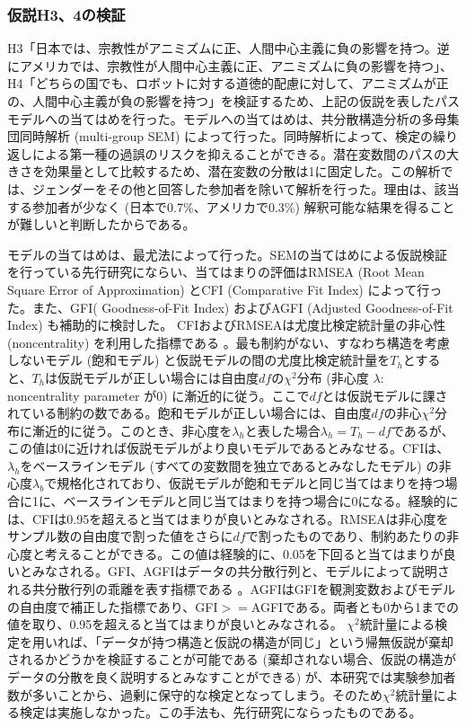 \documentclass[a4j,12pt]{jreport}
\begin{document}
\subsubsection{仮説H3、4の検証}
H3「日本では、宗教性がアニミズムに正、人間中心主義に負の影響を持つ。逆にアメリカでは、宗教性が人間中心主義に正、アニミズムに負の影響を持つ」、H4「どちらの国でも、ロボットに対する道徳的配慮に対して、アニミズムが正の、人間中心主義が負の影響を持つ」を検証するため、上記の仮説を表したパスモデルへの当てはめを行った。モデルへの当てはめは、共分散構造分析の多母集団同時解析 (multi-group SEM) によって行った。同時解析によって、検定の繰り返しによる第一種の過誤のリスクを抑えることができる。潜在変数間のパスの大きさを効果量として比較するため、潜在変数の分散は1に固定した。この解析では、ジェンダーをその他と回答した参加者を除いて解析を行った。理由は、該当する参加者が少なく (日本で0.7\%、アメリカで0.3\%) 解釈可能な結果を得ることが難しいと判断したからである。


モデルの当てはめは、最尤法によって行った。SEMの当てはめによる仮説検証を行っている先行研究\cite{noren}にならい、当てはまりの評価はRMSEA (Root Mean Square Error of Approximation) とCFI (Comparative Fit Index) によって行った。また、GFI( Goodness-of-Fit Index) およびAGFI (Adjusted Goodness-of-Fit Index) も補助的に検討した。
CFIおよびRMSEAは尤度比検定統計量の非心性 (noncentrality) を利用した指標である\cite{hishin} 。最も制約がない、すなわち構造を考慮しないモデル (飽和モデル) と仮説モデルの間の尤度比検定統計量を$T_h$とすると、$T_h$は仮説モデルが正しい場合には自由度$df$の$\chi^2$分布 (非心度 $\lambda$: noncentrality parameter が0) に漸近的に従う。ここで$df$とは仮説モデルに課されている制約の数である。飽和モデルが正しい場合には、自由度$df$の非心$\chi^2$分布に漸近的に従う。このとき、非心度を$\lambda_h$と表した場合$\lambda_h=T_h - df$であるが、この値は0に近ければ仮説モデルがより良いモデルであるとみなせる。CFIは、$\lambda_h$をベースラインモデル (すべての変数間を独立であるとみなしたモデル) の非心度$\lambda_b$で規格化されており、仮説モデルが飽和モデルと同じ当てはまりを持つ場合に1に、ベースラインモデルと同じ当てはまりを持つ場合に0になる。経験的には、CFIは0.95を超えると当てはまりが良いとみなされる。RMSEAは非心度をサンプル数の自由度で割った値をさらに$df$で割ったものであり、制約あたりの非心度と考えることができる。この値は経験的に、0.05を下回ると当てはまりが良いとみなされる。GFI、AGFIはデータの共分散行列と、モデルによって説明される共分散行列の乖離を表す指標である\cite{hishin} 。AGFIはGFIを観測変数およびモデルの自由度で補正した指標であり、GFI$>=$AGFIである。両者とも0から1までの値を取り、0.95を超えると当てはまりが良いとみなされる。
$\chi ^2$統計量による検定を用いれば、「データが持つ構造と仮説の構造が同じ」という帰無仮説が棄却されるかどうかを検証することが可能である (棄却されない場合、仮説の構造がデータの分散を良く説明するとみなすことができる) が、本研究では実験参加者数が多いことから、過剰に保守的な検定となってしまう。そのため$\chi ^2$統計量による検定は実施しなかった。この手法も、先行研究\cite{noren}にならったものである。
\end{document}
